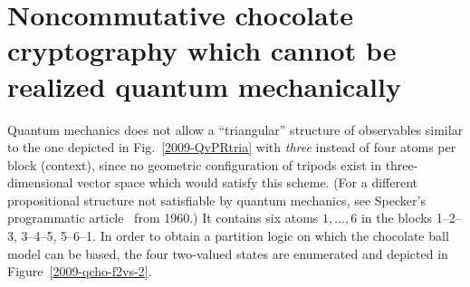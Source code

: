 \documentclass[12pt]{elsarticle}%
\begin{document}
\section{Noncommutative chocolate cryptography which cannot be realized quantum mechanically}

Quantum mechanics does not allow a ``triangular'' structure of observables similar to the one depicted in
Fig.~\ref{2009-QvPRtria} with {\em three} instead of four atoms per block (context),
since no geometric configuration of tripods exist in three-dimensional vector space which would satisfy this scheme.
(For a different propositional structure not satisfiable by quantum mechanics, see Specker's programmatic article~\cite{specker-60} from 1960.)
It contains six atoms $1,\ldots ,6$ in the blocks 1--2--3, 3--4--5, 5--6--1.
In order to obtain a partition logic on which the chocolate ball model can be based, the four two-valued states
are enumerated and depicted in Figure~\ref{2009-qcho-f2vs-2}.
\end{document}
